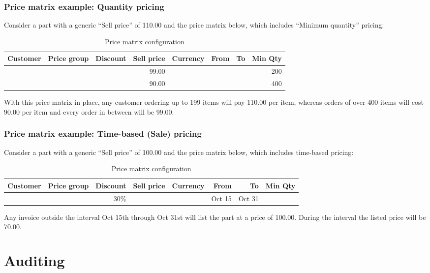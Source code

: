 \subsection{Price matrix example: Quantity pricing}

Consider a part with a generic ``Sell price'' of 110.00 and the price matrix below, which includes
``Minimum quantity'' pricing:

\begin{table}[H]
	\caption{Price matrix configuration}
	\begin{tabular}{|ccrrcrrr|}
		\hline
		\bf Customer & \bf Price group & \bf Discount &  \bf Sell price & \bf Currency & \bf From & \bf To & \bf Min Qty \\
		\hline
		 & & & 99.00 & & & & 200 \\
		\hline
         & & & 90.00 & & & & 400 \\
		\hline
	\end{tabular}
\end{table}

With this price matrix in place, any customer ordering up to 199 items will pay 110.00 per item, whereas orders of over
400 items will cost 90.00 per item and every order in between will be 99.00.

\subsection{Price matrix example: Time-based (Sale) pricing}

Consider a part with a generic ``Sell price'' of 100.00 and the price matrix below, which includes time-based pricing:

\begin{table}[H]
	\caption{Price matrix configuration}
	\begin{tabular}{|ccrrcrrr|}
		\hline
		\bf Customer & \bf Price group & \bf Discount &  \bf Sell price & \bf Currency & \bf From & \bf To & \bf Min Qty \\
		\hline
		& & 30\% & & & Oct 15 & Oct 31 & \\
		\hline
	\end{tabular}
\end{table}

Any invoice outside the interval Oct 15th through Oct 31st will list
the part at a price of 100.00.  During the interval the listed price
will be 70.00.

\chapter{Auditing}
\label{cha-auditing}

